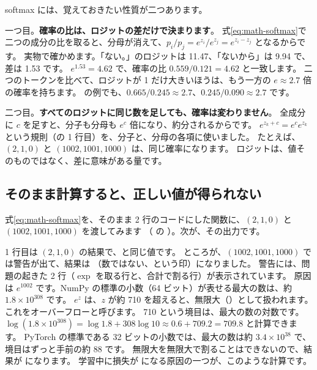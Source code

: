 softmax には、覚えておきたい性質が二つあります。

一つ目。\textbf{確率の比は、ロジットの差だけで決まります}。
式\eqref{eq:math-softmax}で二つの成分の比を取ると、分母が消えて、$p_i/p_j=e^{z_i}/e^{z_j}=e^{z_i-z_j}$ となるからです。
実物で確かめます。「ない。」のロジットは 11.47、「ないから」は 9.94 で、差は 1.53 です。
$e^{1.53}=4.62$ で、確率の比 $0.559/0.121=4.62$ と一致します。
二つのトークンを比べて、ロジットが 1 だけ大きいほうは、もう一方の $e\approx 2.7$ 倍の確率を持ちます。
の例でも、$0.665/0.245\approx 2.7$、$0.245/0.090\approx 2.7$ です。

二つ目。\textbf{すべてのロジットに同じ数を足しても、確率は変わりません}。
全成分に $c$ を足すと、分子も分母も $e^{c}$ 倍になり、約分されるからです。
$e^{z_k+c}=e^{c}e^{z_k}$ という規則（の 1 行目）を、分子と、分母の各項に使いました。
たとえば、$(2,1,0)$ と $(1002,1001,1000)$ は、同じ確率になります。
ロジットは、値そのものではなく、差に意味がある量です。

\subsection*{そのまま計算すると、正しい値が得られない}

式\eqref{eq:math-softmax}を、そのまま 2 行のコードにした関数に、$(2,1,0)$ と $(1002,1001,1000)$ を渡してみます
（ の ）。次が、その出力です。


1 行目は $(2,1,0)$ の結果で、と同じ値です。
ところが、$(1002,1001,1000)$ では警告が出て、結果は （数ではない、という印）になりました。
警告には、問題の起きた 2 行（$\exp$ を取る行と、合計で割る行）が表示されています。
原因は $e^{1002}$ です。NumPy の標準の小数（64 ビット）が表せる最大の数は、約 $1.8\times 10^{308}$ です。
$e^{z}$ は、$z$ が約 710 を超えると、無限大（）として扱われます。これをオーバーフローと呼びます。
710 という境目は、最大の数の対数です。$\log(1.8\times 10^{308})=\log 1.8+308\log 10\approx 0.6+709.2=709.8$ と計算できます。
PyTorch の標準である 32 ビットの小数では、最大の数は約 $3.4\times 10^{38}$ で、境目はずっと手前の約 88 です。
無限大を無限大で割ることはできないので、結果が  になります。
学習中に損失が  になる原因の一つが、このような計算です。

